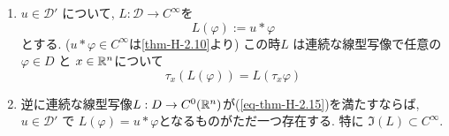 \begin{tcolorbox}[mybox]
\begin{thm}\cite[Theorem 6.33]{Rud}
\label{thm-H-2.15}
\begin{enumerate}[label=$(\alph*)$]
\item \(u \in \mathcal{D}'\) について, \(L : \mathcal{D} \to C^\infty\)を
\[
L(\varphi) := u \ast \varphi 
\]
とする. ($u \ast \varphi  \in C^\infty$は\ref{thm-H-2.10}より)
この時\(L\) は連続な線型写像で任意の\(\varphi \in D\) と \(x \in \mathbb{R}^n\)について
\begin{equation}
\label{eq-thm-H-2.15}
\tau_x(L(\varphi)) = L(\tau_x \varphi) 
\end{equation}
\item 逆に連続な線型写像\(L : D \to C^0(\mathbb{R}^n)\)が(\ref{eq-thm-H-2.15})を満たすならば, 
\(u \in \mathcal{D}'\) で \(L(\varphi) = u \ast \varphi\)となるものがただ一つ存在する. 
特に \(\Im(L) \subset C^\infty\).
\end{enumerate}
\end{thm}
\end{tcolorbox}

